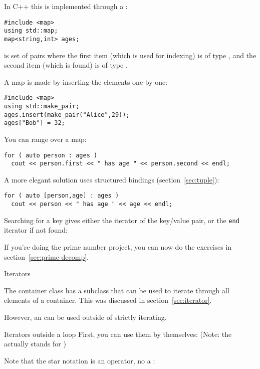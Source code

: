 In C++ this is implemented through a :
\begin{lstlisting}
#include <map>
using std::map;
map<string,int> ages;
\end{lstlisting}
is set of
pairs where the first item (which is used for indexing) is of type
, and the second item (which is found) is of type .

A map is made by inserting the elements one-by-one:
\begin{lstlisting}
#include <map>
using std::make_pair;
ages.insert(make_pair("Alice",29));
ages["Bob"] = 32;
\end{lstlisting}

You can range over a map:
\begin{lstlisting}
for ( auto person : ages )
  cout << person.first << " has age " << person.second << endl;
\end{lstlisting}
A more elegant solution uses structured bindings (section~\ref{sec:tuple}):
\begin{lstlisting}
for ( auto [person,age] : ages )
  cout << person << " has age " << age << endl;
\end{lstlisting}

Searching for a key gives either the iterator of the key/value pair,
or the \lstinline{end} iterator if not found:
%

\begin{exercise}
  If you're doing the prime number project, you can now do
  the exercises in section~\ref{sec:prime-decomp}.
\end{exercise}

 {Iterators}
\label{sec:iterator-class}

The container class has a subclass  that can be
used to iterate through all elements of a container. This was
discussed in section~\ref{sec:iterator}.

However, an  can be used outside of strictly iterating.
\begin{block}{Iterators outside a loop}
  \label{sl:vec-iterator}
  First, you can use them by themselves:
  (Note: the  actually stands for )
\end{block}

Note that the star notation is an operator, no a
:
%

